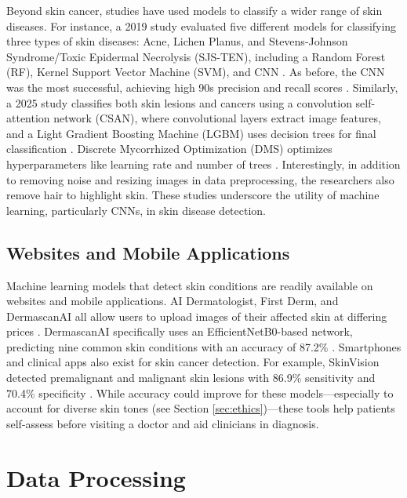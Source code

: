 \documentclass{article} %
\begin{document}
Beyond skin cancer, studies have used models to classify a wider range of skin diseases. For instance, a 2019 study evaluated five different models for classifying three types of skin diseases: Acne, Lichen Planus, and Stevens-Johnson Syndrome/Toxic Epidermal Necrolysis (SJS-TEN), including a Random Forest (RF), Kernel Support Vector Machine (SVM), and CNN \citep{bhadula2019machine}. As before, the CNN was the most successful, achieving high 90s precision and recall scores \citep{bhadula2019machine}. Similarly, a 2025 study classifies both skin lesions and cancers using a convolution self-attention network (CSAN), where convolutional layers extract image features, and a Light Gradient Boosting Machine (LGBM) uses decision trees for final classification \citep{kalpana2025enhancing}. Discrete Mycorrhized Optimization (DMS) optimizes hyperparameters like learning rate and number of trees \citep{kalpana2025enhancing}. Interestingly, in addition to removing noise and resizing images in data preprocessing, the researchers also remove hair to highlight skin. These studies underscore the utility of machine learning, particularly CNNs, in skin disease detection.

\subsection{Websites and Mobile Applications}

Machine learning models that detect skin conditions are readily available on websites and mobile applications. AI Dermatologist, First Derm, and DermascanAI all allow users to upload images of their affected skin at differing prices \citep{aiderm2025,firstderm2025,dermascanai2025}. DermascanAI specifically uses an EfficientNetB0-based network, predicting nine common skin conditions with an accuracy of 87.2\% \citep{vadivelraju2025dermascan}. Smartphones and clinical apps also exist for skin cancer detection. For example, SkinVision detected premalignant and malignant skin lesions with 86.9\% sensitivity and 70.4\% specificity \citep{sangers2022validation}. While accuracy could improve for these models—especially to account for diverse skin tones (see Section \ref{sec:ethics})—these tools help patients self-assess before visiting a doctor and aid clinicians in diagnosis.

\section{Data Processing}
\label{sec:data}
\end{document}
